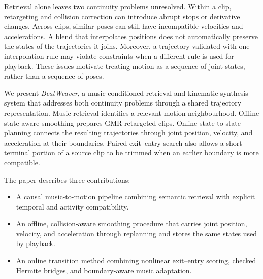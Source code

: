 \documentclass[conference]{IEEEtran}
\begin{document}
Retrieval alone leaves two continuity problems unresolved. Within a clip,
retargeting and collision correction can introduce abrupt stops or derivative
changes. Across clips, similar poses can still have incompatible velocities
and accelerations. A blend that interpolates positions does not automatically
preserve the states of the trajectories it joins. Moreover, a trajectory
validated with one interpolation rule may violate constraints when a different
rule is used for playback. These issues motivate treating motion as a sequence
of joint states, rather than a sequence of poses.

We present \emph{BeatWeaver}, a music-conditioned retrieval and kinematic
synthesis system that addresses both continuity problems through a shared
trajectory representation. Music retrieval identifies a relevant motion
neighbourhood. Offline state-aware smoothing prepares GMR-retargeted clips.
Online state-to-state planning connects the resulting trajectories through
joint position, velocity, and acceleration at their boundaries. Paired
exit--entry search also allows a short terminal
portion of a source clip to be trimmed when an earlier boundary is more
compatible.

The paper describes three contributions:
\begin{itemize}
\item A causal music-to-motion pipeline combining semantic retrieval with
explicit temporal and activity compatibility.
\item An offline, collision-aware smoothing procedure that carries joint
position, velocity, and acceleration through replanning and stores the
same states used by playback.
\item An online transition method combining nonlinear exit--entry scoring,
checked Hermite bridges, and boundary-aware music adaptation.
\end{itemize}
\end{document}
